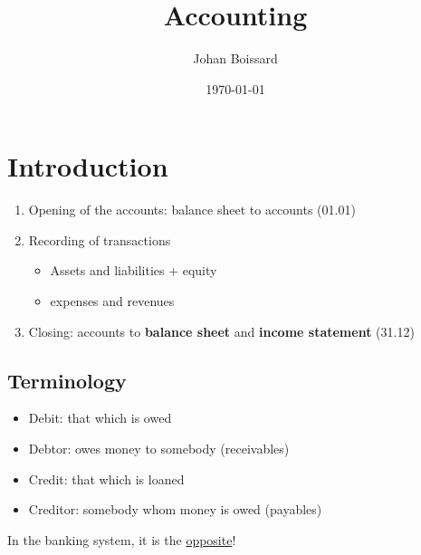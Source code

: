 \documentclass[a4paper] {scrartcl}
\author{Johan Boissard}
\date{\today}
\title{Accounting}
\begin{document}
\maketitle

\section{Introduction}
\begin{enumerate}
	\item Opening of the accounts: balance sheet to accounts (01.01)
	\item Recording of transactions
	\begin{itemize}
		\item Assets and liabilities + equity
		\item expenses and revenues
	\end{itemize}
	\item Closing: accounts to \textbf{balance sheet} and \textbf{income statement} (31.12)
\end{enumerate}

\subsection{Terminology}
\begin{itemize}
	\item Debit: that which is owed
	\item Debtor: owes money to somebody (receivables)
	\item Credit: that which is loaned
	\item Creditor: somebody whom money is owed (payables)
\end{itemize}

In the banking system, it is the \underline{opposite}!
\end{document}
